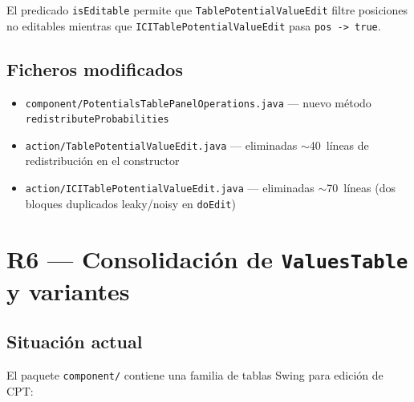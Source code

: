 \documentclass[12pt,a4paper]{article}
\newcommand{\code}[1]{\texttt{#1}}
\newcommand{\clase}[1]{\texttt{#1}}
\newcommand{\metodo}[1]{\texttt{#1}}
\newcommand{\paquete}[1]{\texttt{#1}}
\begin{document}
El predicado \code{isEditable} permite que
\clase{TablePotentialValueEdit} filtre posiciones no editables
mientras que \clase{ICITablePotentialValueEdit} pasa
\code{pos -> true}.

\subsection{Ficheros modificados}

\begin{itemize}[nosep]
  \item \code{component/PotentialsTablePanelOperations.java} --- nuevo
        método \metodo{redistributeProbabilities}
  \item \code{action/TablePotentialValueEdit.java} --- eliminadas
        $\sim$40~líneas de redistribución en el constructor
  \item \code{action/ICITablePotentialValueEdit.java} --- eliminadas
        $\sim$70~líneas (dos bloques duplicados leaky/noisy en
        \metodo{doEdit})
\end{itemize}

\section{R6 --- Consolidación de \clase{ValuesTable} y variantes}
\label{sec:r6}

\subsection{Situación actual}

El paquete \paquete{component/} contiene una familia de tablas Swing
para edición de CPT:
\end{document}
